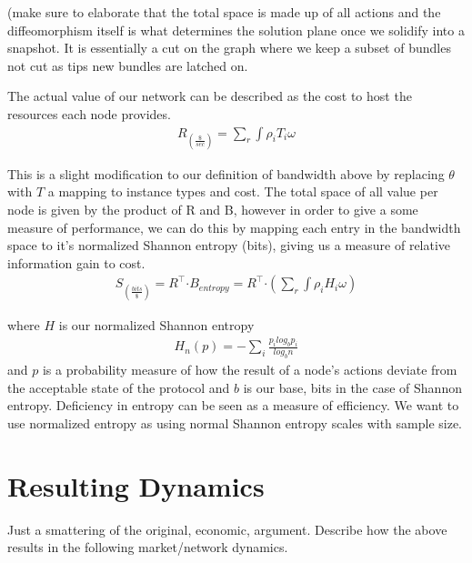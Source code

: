 \documentclass{article}
\begin{document}
(make sure to elaborate that the total space is made up of all actions and the diffeomorphism itself is what determines the solution plane once we solidify into a snapshot. It is essentially a cut on the graph where we keep a subset of bundles not cut as tips new bundles are latched on.

The actual value of our network can be described as the cost to host the resources each node provides. 
\begin{equation*} \label{eq1}
\begin{split}
R_{(\frac{\$}{sec})} = \sum_{r} \int \rho_i T_i \omega
\end{split}
\end{equation*}

This is a slight modification to our definition of bandwidth above by replacing $\theta$ with $T$ a mapping to instance types and cost. The total space of all value per node is given by the product of R and B, however in order to give a some measure of performance, we can do this by mapping each entry in the bandwidth space to it's normalized Shannon entropy (bits), giving us a measure of relative information gain to cost.
\begin{equation*} \label{eq1}
\begin{split}
S_{(\frac{bits}{\$})} = R^\top  \boldsymbol{\cdot} B_{entropy} = R^\top  \boldsymbol{\cdot}  (\sum_{r} \int \rho_i H_i \omega )
\end{split}
\end{equation*}

where $H$ is our normalized Shannon entropy
\begin{equation*} \label{eq1}
\begin{split}
H_n(p) = - \sum_i \frac{p_i log_b p_i}{log_b n}
\end{split}
\end{equation*}
and $p$ is a probability measure of how the result of a node's actions deviate from the acceptable state of the protocol and $b$ is our base, bits in the case of Shannon entropy. Deficiency in entropy can be seen as a measure of efficiency. We want to use normalized entropy as using normal Shannon entropy scales with sample size.

\section{Resulting Dynamics}
Just a smattering of the original, economic, argument. Describe how the above results in the following market/network dynamics.
\end{document}

